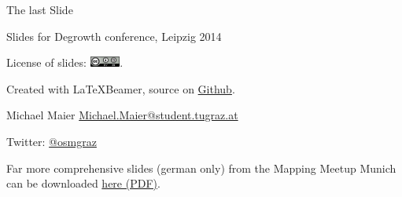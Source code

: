 \documentclass{beamer}
\begin{document}
\begin{frame}{The last Slide}

  Slides for Degrowth conference, Leipzig 2014
\vspace{0.7cm}

License of slides: \includegraphics[width=1cm]{cc-by-sa.png}.
\vspace{0.7cm}

Created with \LaTeX Beamer, source on \href{https://github.com/species/slides-osm-degrowth}{Github}.
\vspace{0.7cm}

Michael Maier \href{mailto:michael.maier@student.tugraz.at}{Michael.Maier@student.tugraz.at}

Twitter: \href{https://twitter.com/osmgraz}{@osmgraz}

\vspace{0.7cm}
Far more comprehensive slides (german only) from the Mapping Meetup Munich can be downloaded \href{https://github.com/species/vortrag-osm-mmm/blob/master/vortrag.pdf}{here (PDF)}.

\end{frame}
\end{document}
